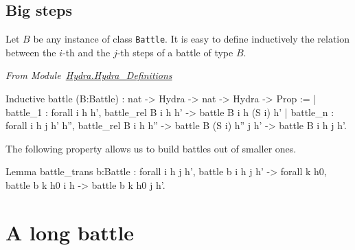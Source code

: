 \subsection{Big steps}

Let $B$ be any instance of class \texttt{Battle}. It is easy to define inductively the relation between the $i$-th and the $j$-th steps of a battle of type $B$.

\vspace{4pt}
\emph{From Module~\href{../theories/html/hydras.Hydra.Hydra_Definitions.html\#fight}{Hydra.Hydra\_Definitions}}

\begin{Coqsrc}
Inductive battle (B:Battle) : nat -> Hydra -> nat -> Hydra -> Prop :=
| battle_1 : forall i h  h', 
      battle_rel   B i  h h' -> battle B i h (S i) h'
| battle_n : forall i h  j h' h'',  
      battle_rel  B i h h''  ->
      battle B (S i) h'' j h'  ->
      battle B i h j h'.
\end{Coqsrc}

The following property allows us to build battles out of smaller ones.

\begin{Coqsrc}
Lemma battle_trans {b:Battle} :
  forall i h j h', battle b i h j h' ->
        forall k h0,  battle b k h0 i h -> battle b k h0 j h'.
\end{Coqsrc}



 




\section{A long battle}
\label{sect:big-battle}


